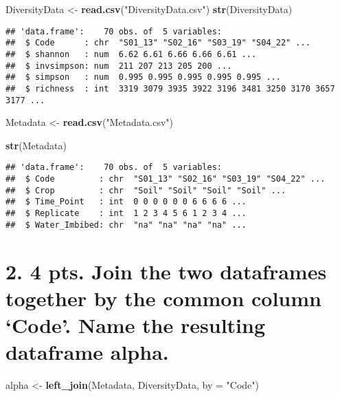 \documentclass[
]{article}
\newenvironment{Shaded}{\begin{snugshade}}{\end{snugshade}}
\newcommand{\AttributeTok}[1]{\textcolor[rgb]{0.13,0.29,0.53}{#1}}
\newcommand{\FunctionTok}[1]{\textcolor[rgb]{0.13,0.29,0.53}{\textbf{#1}}}
\newcommand{\NormalTok}[1]{#1}
\newcommand{\OtherTok}[1]{\textcolor[rgb]{0.56,0.35,0.01}{#1}}
\newcommand{\StringTok}[1]{\textcolor[rgb]{0.31,0.60,0.02}{#1}}
\begin{document}
\begin{Shaded}
\begin{Highlighting}[]
\NormalTok{DiversityData }\OtherTok{\textless{}{-}} \FunctionTok{read.csv}\NormalTok{(}\StringTok{"DiversityData.csv"}\NormalTok{)}
\FunctionTok{str}\NormalTok{(DiversityData)}
\end{Highlighting}
\end{Shaded}

\begin{verbatim}
## 'data.frame':    70 obs. of  5 variables:
##  $ Code      : chr  "S01_13" "S02_16" "S03_19" "S04_22" ...
##  $ shannon   : num  6.62 6.61 6.66 6.66 6.61 ...
##  $ invsimpson: num  211 207 213 205 200 ...
##  $ simpson   : num  0.995 0.995 0.995 0.995 0.995 ...
##  $ richness  : int  3319 3079 3935 3922 3196 3481 3250 3170 3657 3177 ...
\end{verbatim}

\begin{Shaded}
\begin{Highlighting}[]
\NormalTok{Metadata }\OtherTok{\textless{}{-}} \FunctionTok{read.csv}\NormalTok{(}\StringTok{"Metadata.csv"}\NormalTok{)}

\FunctionTok{str}\NormalTok{(Metadata)}
\end{Highlighting}
\end{Shaded}

\begin{verbatim}
## 'data.frame':    70 obs. of  5 variables:
##  $ Code         : chr  "S01_13" "S02_16" "S03_19" "S04_22" ...
##  $ Crop         : chr  "Soil" "Soil" "Soil" "Soil" ...
##  $ Time_Point   : int  0 0 0 0 0 0 6 6 6 6 ...
##  $ Replicate    : int  1 2 3 4 5 6 1 2 3 4 ...
##  $ Water_Imbibed: chr  "na" "na" "na" "na" ...
\end{verbatim}

\section{2. 4 pts. Join the two dataframes together by the common column
`Code'. Name the resulting dataframe
alpha.}\label{pts.-join-the-two-dataframes-together-by-the-common-column-code.-name-the-resulting-dataframe-alpha.}

\begin{Shaded}
\begin{Highlighting}[]
\NormalTok{alpha  }\OtherTok{\textless{}{-}} \FunctionTok{left\_join}\NormalTok{(Metadata, DiversityData, }\AttributeTok{by =} \StringTok{"Code"}\NormalTok{)}
\end{Highlighting}
\end{Shaded}
\end{document}
